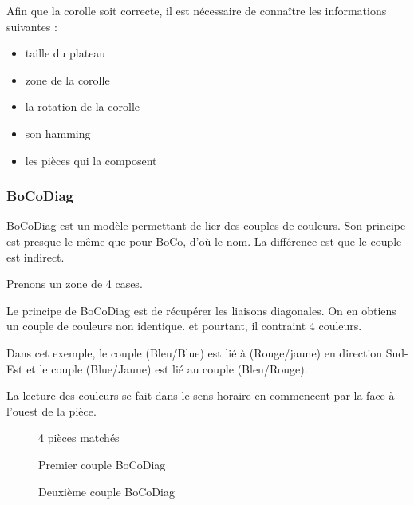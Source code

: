	Afin que la corolle soit correcte, il est nécessaire de connaître les informations suivantes :
	\begin{itemize}
		\item taille du plateau
		\item zone de la corolle
		\item la rotation de la corolle
		\item son hamming
		\item les pièces qui la composent
	\end{itemize}
\newpage	

	\subsubsection{BoCoDiag}
	
	
	BoCoDiag est un modèle permettant de lier des couples de couleurs. Son principe est presque le même que pour BoCo, d'où le nom. La différence est que le couple est indirect.
	
	\begin{exmp}
		Prenons un zone de 4 cases.
		
		Le principe de BoCoDiag est de récupérer les liaisons diagonales. On en obtiens un couple de couleurs non identique. et pourtant, il contraint 4 couleurs.
		
		Dans cet exemple, le couple (Bleu/Blue) est lié à (Rouge/jaune) en direction Sud-Est et le couple (Blue/Jaune) est lié au couple (Bleu/Rouge). 
		
		\begin{note}
			La lecture des couleurs se fait dans le sens horaire en commencent par la face à l'ouest de la pièce.
		\end{note}
		\begin{minipage}{0.30\textwidth}
			\begin{figure}[H]
				
				\caption{4 pièces matchés}\label{fig:bocodiag}
			\end{figure}		
		\end{minipage}\hfill
		\begin{minipage}{0.30\textwidth}
			\begin{figure}[H]
				
				\caption{Premier couple BoCoDiag}\label{fig:bocodiag_1}
			\end{figure}		
		\end{minipage}\hfill
		\begin{minipage}{0.30\textwidth}
			\begin{figure}[H]
				
				\caption{Deuxième couple BoCoDiag}\label{fig:bocodiag_2}
			\end{figure}		
		\end{minipage}\hfill	
	\end{exmp}
	\newpage
	
